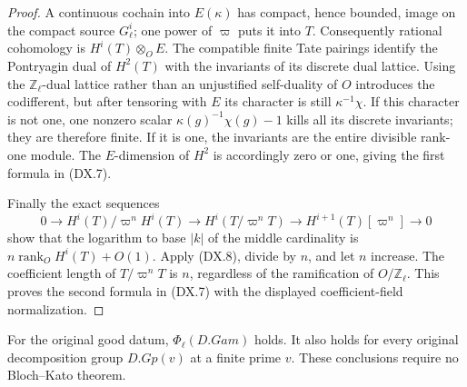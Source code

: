 \begin{proof}
A continuous cochain into $E(\kappa)$ has compact, hence bounded,
image on the compact source $G_\ell^i$; one power of $\varpi$
puts it into $T$.  Consequently rational cohomology is
$H^i(T)\otimes_OE$.
The compatible finite Tate pairings identify the Pontryagin dual
of $H^2(T)$ with the invariants of its discrete dual lattice.
Using the $\mathbb Z_\ell$-dual lattice rather than an
unjustified self-duality of $O$ introduces the codifferent,
but after tensoring with $E$ its character is still
$\kappa^{-1}\chi$.
If this character is not one, one nonzero scalar
$\kappa(g)^{-1}\chi(g)-1$ kills all its discrete invariants;
they are therefore finite.  If it is one, the invariants are
the entire divisible rank-one module.  The $E$-dimension of
$H^2$ is accordingly zero or one, giving the first formula
in (DX.7).

Finally the exact sequences
\[
 0\to H^i(T)/\varpi^nH^i(T)
 \to H^i(T/\varpi^nT)
 \to H^{i+1}(T)[\varpi^n]\to0
\]
show that the logarithm to base $|k|$ of the middle cardinality
is $n\operatorname{rank}_OH^i(T)+O(1)$.
Apply (DX.8), divide by $n$, and let $n$ increase.
The coefficient length of $T/\varpi^nT$ is $n$, regardless of
the ramification of $O/\mathbb Z_\ell$.
This proves the second formula in (DX.7) with the displayed
coefficient-field normalization.
\end{proof}

\begin{proposition}
\label{claim:DX2}
For the original good datum,
$\Phi_\ell(D.Gam)$ holds.  It also holds for every original
decomposition group $D.Gp(v)$ at a finite prime $v$.
These conclusions require no Bloch--Kato theorem.
\end{proposition}


